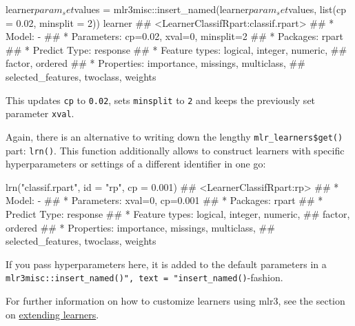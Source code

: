 \documentclass[
  11pt,
  parskip=half,
  DIV=calc,
  BCOR=10mm,
  x11names]{scrbook}
\newenvironment{Shaded}{}{}
\newcommand{\DataTypeTok}[1]{#1}
\newcommand{\DecValTok}[1]{#1}
\newcommand{\FloatTok}[1]{#1}
\newcommand{\KeywordTok}[1]{\textcolor[rgb]{0.00,0.00,1.00}{#1}}
\newcommand{\NormalTok}[1]{#1}
\newcommand{\OperatorTok}[1]{#1}
\newcommand{\StringTok}[1]{\textcolor[rgb]{0.00,0.50,0.50}{#1}}
\begin{document}
\begin{Shaded}
\begin{Highlighting}[]
\NormalTok{learner}\OperatorTok{$}\NormalTok{param_set}\OperatorTok{$}\NormalTok{values =}\StringTok{ }\NormalTok{mlr3misc}\OperatorTok{::}\KeywordTok{insert_named}\NormalTok{(learner}\OperatorTok{$}\NormalTok{param_set}\OperatorTok{$}\NormalTok{values, }
  \KeywordTok{list}\NormalTok{(}\DataTypeTok{cp =} \FloatTok{0.02}\NormalTok{, }\DataTypeTok{minsplit =} \DecValTok{2}\NormalTok{))}
\NormalTok{learner}
\NormalTok{## <LearnerClassifRpart:classif.rpart>}
\NormalTok{## * Model: -}
\NormalTok{## * Parameters: cp=0.02, xval=0, minsplit=2}
\NormalTok{## * Packages: rpart}
\NormalTok{## * Predict Type: response}
\NormalTok{## * Feature types: logical, integer, numeric,}
\NormalTok{##   factor, ordered}
\NormalTok{## * Properties: importance, missings, multiclass,}
\NormalTok{##   selected_features, twoclass, weights}
\end{Highlighting}
\end{Shaded}

This updates \texttt{cp} to \texttt{0.02}, sets \texttt{minsplit} to \texttt{2} and keeps the previously set parameter \texttt{xval}.

Again, there is an alternative to writing down the lengthy \texttt{mlr\_learners\$get()} part: \texttt{lrn()}.
This function additionally allows to construct learners with specific hyperparameters or settings of a different identifier in one go:

\begin{Shaded}
\begin{Highlighting}[]
\KeywordTok{lrn}\NormalTok{(}\StringTok{"classif.rpart"}\NormalTok{, }\DataTypeTok{id =} \StringTok{"rp"}\NormalTok{, }\DataTypeTok{cp =} \FloatTok{0.001}\NormalTok{)}
\NormalTok{## <LearnerClassifRpart:rp>}
\NormalTok{## * Model: -}
\NormalTok{## * Parameters: xval=0, cp=0.001}
\NormalTok{## * Packages: rpart}
\NormalTok{## * Predict Type: response}
\NormalTok{## * Feature types: logical, integer, numeric,}
\NormalTok{##   factor, ordered}
\NormalTok{## * Properties: importance, missings, multiclass,}
\NormalTok{##   selected_features, twoclass, weights}
\end{Highlighting}
\end{Shaded}

If you pass hyperparameters here, it is added to the default parameters in a \texttt{mlr3misc::insert\_named()",\ text\ =\ "insert\_named()}-fashion.

For further information on how to customize learners using mlr3, see the section on \protect\hyperlink{ext-learner}{extending learners}.
\end{document}
